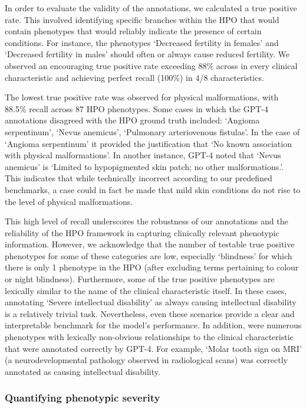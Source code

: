 \documentclass[
]{agujournal2019}
\begin{document}
In order to evaluate the validity of the annotations, we calculated a
true positive rate. This involved identifying specific branches within
the HPO that would contain phenotypes that would reliably indicate the
presence of certain conditions. For instance, the phenotypes `Decreased
fertility in females' and `Decreased fertility in males' should often or
always cause reduced fertility. We observed an encouraging true positive
rate exceeding 88\% across in every clinical characteristic and
achieving perfect recall (100\%) in 4/8 characteristics.

The lowest true positive rate was observed for physical malformations,
with 88.5\% recall across 87 HPO phenotypes. Some cases in which the
GPT-4 annotations disagreed with the HPO ground truth included: `Angioma
serpentinum', `Nevus anemicus', `Pulmonary arteriovenous fistulas'. In
the case of `Angioma serpentinum' it provided the justification that `No
known association with physical malformations'. In another instance,
GPT-4 noted that `Nevus anemicus' is `Limited to hypopigmented skin
patch; no other malformations.'. This indicates that while technically
incorrect according to our predefined benchmarks, a case could in fact
be made that mild skin conditions do not rise to the level of physical
malformations.

This high level of recall underscores the robustness of our annotations
and the reliability of the HPO framework in capturing clinically
relevant phenotypic information. However, we acknowledge that the number
of testable true positive phenotypes for some of these categories are
low, especially `blindness' for which there is only 1 phenotype in the
HPO (after excluding terms pertaining to colour or night blindness).
Furthermore, some of the true positive phenotypes are lexically similar
to the name of the clinical characteristic itself. In these cases,
annotating `Severe intellectual disability' as always causing
intellectual disability is a relatively trivial task. Nevertheless, even
these scenarios provide a clear and interpretable benchmark for the
model's performance. In addition, were numerous phenotypes with
lexically non-obvious relationships to the clinical characteristic that
were annotated correctly by GPT-4. For example, `Molar tooth sign on
MRI' (a neurodevelopmental pathology observed in radiological scans) was
correctly annotated as causing intellectual disability.

\subsubsection{Quantifying phenotypic
severity}\label{quantifying-phenotypic-severity}
\end{document}
